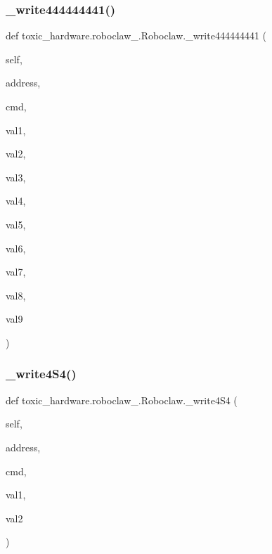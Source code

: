 \subsubsection{\texorpdfstring{\+\_\+write444444441()}{\_write444444441()}}
{\footnotesize\ttfamily def toxic\+\_\+hardware.\+roboclaw\+\_.\+Roboclaw.\+\_\+write444444441 (\begin{DoxyParamCaption}\item[{}]{self,  }\item[{}]{address,  }\item[{}]{cmd,  }\item[{}]{val1,  }\item[{}]{val2,  }\item[{}]{val3,  }\item[{}]{val4,  }\item[{}]{val5,  }\item[{}]{val6,  }\item[{}]{val7,  }\item[{}]{val8,  }\item[{}]{val9 }\end{DoxyParamCaption})\hspace{0.3cm}{\ttfamily [private]}}

\mbox{\label{classtoxic__hardware_1_1roboclaw__3_1_1Roboclaw_a6a6d3dfaaf28bc1d51257fc17dfd934b}} 
\subsubsection{\texorpdfstring{\+\_\+write4\+S4()}{\_write4S4()}}
{\footnotesize\ttfamily def toxic\+\_\+hardware.\+roboclaw\+\_.\+Roboclaw.\+\_\+write4\+S4 (\begin{DoxyParamCaption}\item[{}]{self,  }\item[{}]{address,  }\item[{}]{cmd,  }\item[{}]{val1,  }\item[{}]{val2 }\end{DoxyParamCaption})\hspace{0.3cm}{\ttfamily [private]}}

